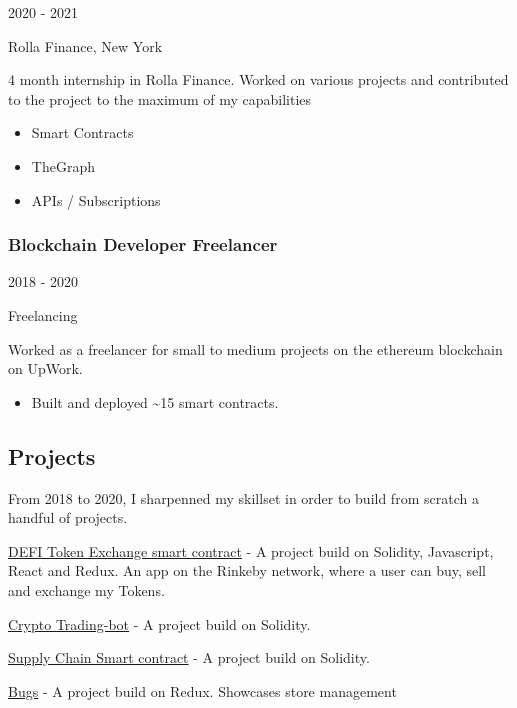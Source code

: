 \documentclass[english,]{article}
\providecommand{\tightlist}{%
  \setlength{\itemsep}{0pt}\setlength{\parskip}{0pt}}
\begin{document}
2020 - 2021

Rolla Finance, New York

4 month internship in Rolla Finance. Worked on various projects and
contributed to the project to the maximum of my capabilities

\begin{itemize}
\tightlist
\item
  Smart Contracts
\item
  TheGraph
\item
  APIs / Subscriptions
\end{itemize}

\hypertarget{blockchain-developer-freelancer}{%
\subsubsection{Blockchain Developer
Freelancer}\label{blockchain-developer-freelancer}}

2018 - 2020

Freelancing

Worked as a freelancer for small to medium projects on the ethereum
blockchain on UpWork.

\begin{itemize}
\tightlist
\item
  Built and deployed \textasciitilde{}15 smart contracts.
\end{itemize}

\hypertarget{projects}{%
\subsection{\texorpdfstring{{ \emph{} \emph{} }
Projects}{    Projects}}\label{projects}}

From 2018 to 2020, I sharpenned my skillset in order to build from
scratch a handful of projects.

{ \href{https://github.com/CptMike/TokenExchangeFullstack}{DEFI Token
Exchange smart contract} } - {A project build on Solidity, Javascript,
React and Redux. An app on the Rinkeby network, where a user can buy,
sell and exchange my Tokens.}

{ \href{https://github.com/CptMike/trading-bot}{Crypto Trading-bot} } -
{A project build on Solidity.}

{ \href{https://github.com/CptMike/supply-chain}{Supply Chain Smart
contract} } - {A project build on Solidity.}

{ \href{https://github.com/CptMike/Bugs}{Bugs} } - {A project build on
Redux. Showcases store management}
\end{document}
